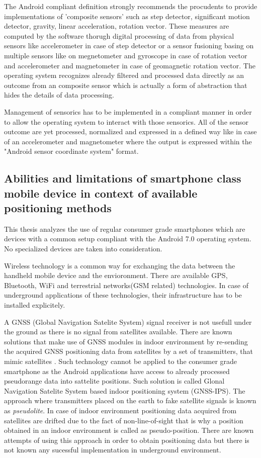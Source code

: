 \documentclass[../main.tex]{subfiles}
\begin{document}
The Android compliant definition strongly recommends the procudents to provide implementations of 'composite sensors' such as step detector, significant motion detector, gravity, linear acceleration, rotation vector. These measures are computed by the software thorugh digital processing of data from physical sensors like accelerometer in case of step detector or a sensor fusioning basing on multiple sensors like on megnetometer and gyroscope in case of rotation vector and accelerometer and magnetometer in case of geomagnetic rotation vector. The operating system recognizes already filtered and processed data directly as an outcome from an composite sensor which is actually a form of abstraction that hides the details of data processing.

Management of sensorics has to be implemented in a compliant manner in order to allow the operating system to interact with those sensorics. All of the sensor outcome are yet processed, normalized and expressed in a defined way like in case of an accelerometer and magnetometer where the output is expressed within the "Android sensor coordinate system" format.


\subsection{Abilities and limitations of smartphone class mobile device in context of available positioning methods}
\label{subs:smartphone_abilities_and_limitations}

This thesis analyzes the use of regular consumer grade smartphones which are devices with a common setup compliant with the Android 7.0 operating system. No specialized devices are taken into consideration.

Wireless technology is a common way for exchanging the data between the handheld mobile device and the envioronment. There are available GPS, Bluetooth, WiFi and terrestrial networks(GSM related) technologies. In case of underground applications of these technologies, their infrastructure has to be installed explicitely.

A GNSS (Global Navigation Satelite System) signal receiver is not usefull under the ground as there is no signal from satellites available. There are known solutions that  make use of GNSS modules in indoor environment by re-sending the acquired GNSS positioning data from satellites by a set of transmitters, that mimic satellites \cite{GPS_retransmission}. Such technology cannot be applied to the consumer grade smartphone as the Android applications have access to already processed pseudorange data into sattelite positions. Such solution is called Glonal Navigation Satelite System based indoor positioning system (GNSS-IPS)\cite{GPS_retransmission_differential}. The approach where transmitters placed on the earth to fake satellite signals is known as \textit{pseudolite}. In case of indoor environment positioning data acquired from satellites are drifted due to the fact of non-line-of-sight that is why a position obtained in an indoor environment is called as pseudo-position. There are known attempts of using this approach in order to obtain positioning data but there is not known any sucessful implementation in underground environment.
\end{document}
